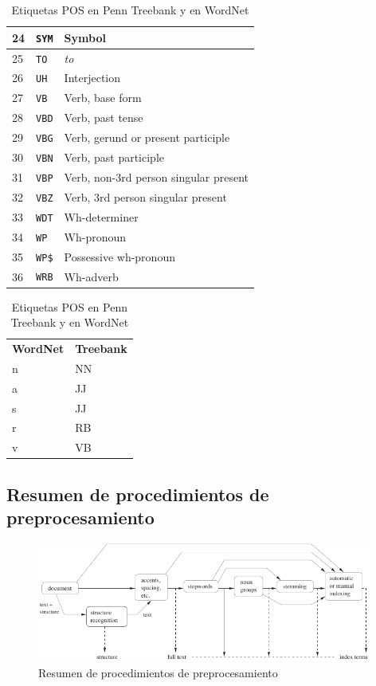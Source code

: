 \begin{table}[htbp]
\begin{subtable}[t]{0.60\linewidth}
\begin{tabular}{|l|l|l|}
24 & \verb=SYM= & Symbol \\ \hline
25 & \verb=TO= & \emph{to} \\ \hline
26 & \verb=UH= & Interjection \\ \hline
27 & \verb=VB= & Verb, base form \\ \hline
28 & \verb=VBD= & Verb, past tense \\ \hline
29 & \verb=VBG= & Verb, gerund or present participle \\ \hline
30 & \verb=VBN= & Verb, past participle \\ \hline
31 & \verb=VBP= & Verb, non-3rd person singular present \\ \hline
32 & \verb=VBZ= & Verb, 3rd person singular present \\ \hline
33 & \verb=WDT= & Wh-determiner \\ \hline
34 & \verb=WP= & Wh-pronoun \\ \hline
35 & \verb=WP$= & Possessive wh-pronoun \\ \hline
36 & \verb=WRB= & Wh-adverb \\ \hline
\end{tabular}
\caption{POS tags del Penn Treebank}
\label{tbl:pos-tags-peen-treebank}
\end{subtable}
\begin{subtable}{0.37\linewidth}
\centering
\begin{tabular}{|l|l|}
\hline
\textbf{WordNet} & \textbf{Treebank} \\ \hhline{==}
n & NN \\ \hline
a & JJ \\ \hline
s & JJ \\ \hline
r & RB \\ \hline
v & VB \\ \hline
\end{tabular}
\caption{POS tags correspondientes en WordNet}
\label{tbl:pos-tags-wordnet}
\end{subtable}
\caption{Etiquetas POS en Penn Treebank y en WordNet}
\label{tbl:pos-tags}
\end{table}

\FloatBarrier
\subsection{Resumen de procedimientos de preprocesamiento}

\begin{figure}[H]
\includegraphics[width=0.98\textwidth]{procesamiento-textos-mod-ir}
\caption[Resumen de procedimientos de preprocesamiento]{Resumen de procedimientos de preprocesamiento \citep[cap. 7]{Baeza-Yates2011}}
\end{figure}


